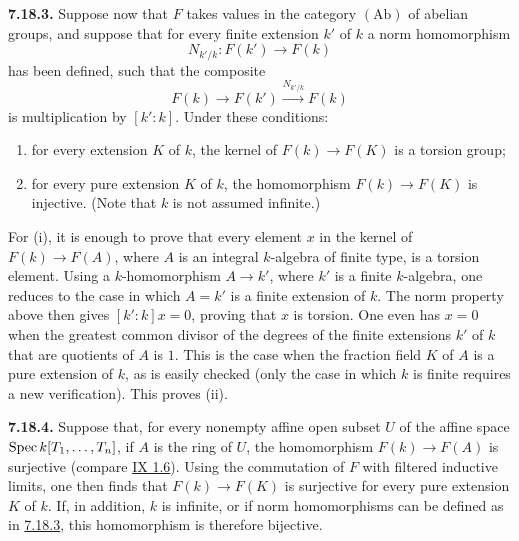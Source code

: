 \textbf{7.18.3.}
Suppose now that $F$ takes values in the category $(\mathrm{Ab})$ of
abelian groups, and suppose that for every finite extension $k'$ of $k$ a
norm homomorphism
\[
N_{k'/k}:F(k')\longrightarrow F(k)
\]
has been defined, such that the composite
\[
F(k)\longrightarrow F(k')\xrightarrow{N_{k'/k}}F(k)
\]
is multiplication by $[k':k]$. Under these conditions:
\begin{enumerate}[label=(\roman*)]
\item for every extension $K$ of $k$, the kernel of
  $F(k)\to F(K)$ is a torsion group;
\item for every pure extension $K$ of $k$, the homomorphism
  $F(k)\to F(K)$ is injective. (Note that $k$ is not assumed infinite.)
\end{enumerate}

For (i), it is enough to prove that every element $x$ in the kernel of
$F(k)\to F(A)$, where $A$ is an integral $k$-algebra of finite type, is a
torsion element. Using a $k$-homomorphism $A\to k'$, where $k'$ is a finite
$k$-algebra, one reduces to the case in which $A=k'$ is a finite extension
of $k$. The norm property above then gives $[k':k]x=0$, proving that $x$ is
torsion. One even has $x=0$ when the greatest common divisor of the degrees
of the finite extensions $k'$ of $k$ that are quotients of $A$ is $1$. This
is the case when the fraction field $K$ of $A$ is a pure extension of $k$,
as is easily checked (only the case in which $k$ is finite requires a new
verification). This proves (ii).

\textbf{7.18.4.}
Suppose that, for every nonempty affine open subset $U$ of the affine space
$\operatorname{Spec} k[T_1,\ldots,T_n]$, if $A$ is the ring of $U$, the homomorphism
$F(k)\to F(A)$ is surjective (compare \hyperlink{sga6.e09.prop.1-6}{IX 1.6}). Using the commutation of $F$
with filtered inductive limits, one then finds that
$F(k)\to F(K)$ is surjective for every pure extension $K$ of $k$. If, in
addition, $k$ is infinite, or if norm homomorphisms can be defined as in
\hyperlink{sga6.e10.para.7-18-3}{7.18.3}, this homomorphism is therefore bijective.


